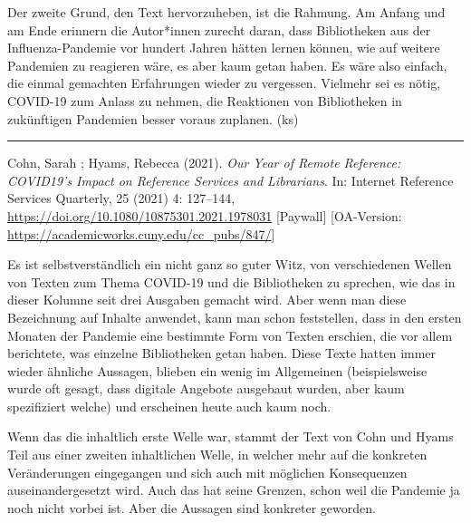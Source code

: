 \documentclass[a4paper,
fontsize=11pt,
oneside,
numbers=noperiodatend,
parskip=half-,
bibliography=totoc,
final
]{scrartcl}
\begin{document}
Der zweite Grund, den Text hervorzuheben, ist die Rahmung. Am Anfang und
am Ende erinnern die Autor*innen zurecht daran, dass Bibliotheken aus
der Influenza-Pandemie vor hundert Jahren hätten lernen können, wie auf
weitere Pandemien zu reagieren wäre, es aber kaum getan haben. Es wäre
also einfach, die einmal gemachten Erfahrungen wieder zu vergessen.
Vielmehr sei es nötig, COVID-19 zum Anlass zu nehmen, die Reaktionen von
Bibliotheken in zukünftigen Pandemien besser voraus zuplanen. (ks)

\begin{center}\rule{0.5\linewidth}{0.5pt}\end{center}

\pagebreak

Cohn, Sarah ; Hyams, Rebecca (2021). \emph{Our Year of Remote Reference:
COVID19's Impact on Reference Services and Librarians}. In: Internet
Reference Services Quarterly, \hspace{0pt}\hspace{0pt}25 (2021) 4:
127--144, \url{https://doi.org/10.1080/10875301.2021.1978031}
{[}Paywall{]} {[}OA-Version:
\url{https://academicworks.cuny.edu/cc_pubs/847/}{]}

Es ist selbstverständlich ein nicht ganz so guter Witz, von
verschiedenen Wellen von Texten zum Thema COVID-19 und die Bibliotheken
zu sprechen, wie das in dieser Kolumne seit drei Ausgaben gemacht wird.
Aber wenn man diese Bezeichnung auf Inhalte anwendet, kann man schon
feststellen, dass in den ersten Monaten der Pandemie eine bestimmte Form
von Texten erschien, die vor allem berichtete, was einzelne Bibliotheken
getan haben. Diese Texte hatten immer wieder ähnliche Aussagen, blieben
ein wenig im Allgemeinen (beispielsweise wurde oft gesagt, dass digitale
Angebote ausgebaut wurden, aber kaum spezifiziert welche) und erscheinen
heute auch kaum noch.

Wenn das die inhaltlich erste Welle war, stammt der Text von Cohn und
Hyams Teil aus einer zweiten inhaltlichen Welle, in welcher mehr auf die
konkreten Veränderungen eingegangen und sich auch mit möglichen
Konsequenzen auseinandergesetzt wird. Auch das hat seine Grenzen, schon
weil die Pandemie ja noch nicht vorbei ist. Aber die Aussagen sind
konkreter geworden.
\end{document}
